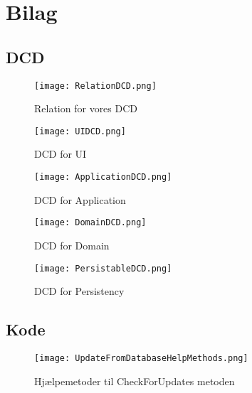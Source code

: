 \section{Bilag}

\subsection{DCD}
\begin{figure}[H]
    \caption{Relation for vores DCD}
    \centering
        \texttt{[image: RelationDCD.png]}
    \label{bilag:RelationDCD}
\end{figure}

\begin{sidewaysfigure}[p]
    \caption{DCD for UI}
    \centering
        \texttt{[image: UIDCD.png]}
    \label{bilag:UIDCD}
\end{sidewaysfigure}

\begin{sidewaysfigure}[p]
    \caption{DCD for Application}
    \centering
        \texttt{[image: ApplicationDCD.png]}
    \label{bilag:ApplicationDCD}
\end{sidewaysfigure}

\begin{figure}[H]
    \caption{DCD for Domain}
    \centering
        \texttt{[image: DomainDCD.png]}
    \label{bilag:DomainDCD}
\end{figure}

\begin{figure}[h]
    \caption{DCD for Persistency}
    \centering
        \texttt{[image: PersistableDCD.png]}
    \label{bilag:PersistableDCD}
\end{figure}

\newpage
\subsection{Kode}

\begin{figure}[H]
    \caption{Hjælpemetoder til CheckForUpdates metoden}
    \centering
        \texttt{[image: UpdateFromDatabaseHelpMethods.png]}
    \label{bilag:CheckForUpdates }
\end{figure}